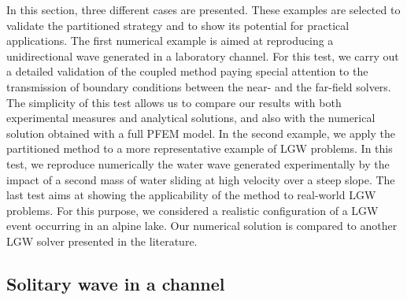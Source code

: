In this section, three different cases are presented. These examples are selected to validate the partitioned strategy and to show its potential for practical applications. The first numerical example is aimed at reproducing a unidirectional wave generated in a laboratory channel. For this test, we carry out a detailed validation of the coupled method paying special attention to the transmission of boundary conditions between the near- and the far-field solvers. The simplicity of this test allows us to compare our results with both experimental measures and analytical solutions, and also with the numerical solution obtained with a full PFEM model. In the second example, we apply the partitioned method to a more representative example of LGW problems.  In this test, we reproduce numerically the water wave generated experimentally by the impact of a second mass of water sliding at high velocity over a steep slope. The last test aims at showing the applicability of the method to real-world LGW problems. For this purpose, we considered a realistic configuration of a LGW event occurring in an alpine lake. Our numerical solution is compared to another LGW solver presented in the literature.



\subsection{Solitary wave in a channel}
\label{Example1}

